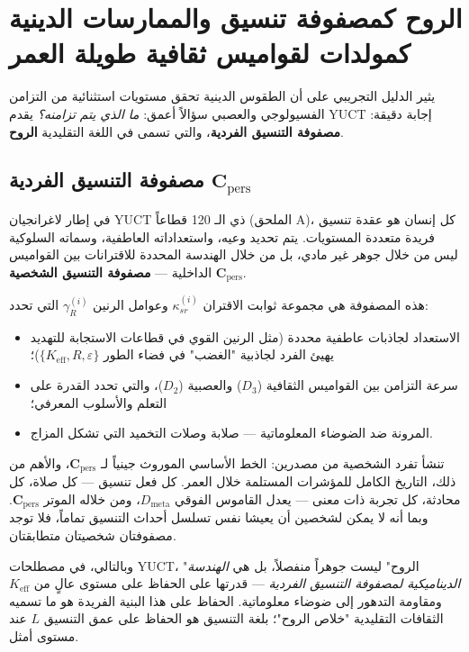 \documentclass[12pt,a4paper]{article}
\begin{document}
	\section{الروح كمصفوفة تنسيق والممارسات الدينية كمولدات لقواميس ثقافية طويلة العمر}
	\label{sec:soul-matrix}
	
	يثير الدليل التجريبي على أن الطقوس الدينية تحقق مستويات استثنائية من التزامن الفسيولوجي والعصبي سؤالاً أعمق: \emph{ما الذي يتم تزامنه؟} يقدم YUCT إجابة دقيقة: \textbf{مصفوفة التنسيق الفردية}، والتي تسمى في اللغة التقليدية \textbf{الروح}.
	
	\subsection{مصفوفة التنسيق الفردية \(\mathbf{C}_{\text{pers}}\)}
	
	في إطار لاغرانجيان YUCT ذي الـ 120 قطاعاً (الملحق A)، كل إنسان هو عقدة تنسيق فريدة متعددة المستويات. يتم تحديد وعيه، واستعداداته العاطفية، وسماته السلوكية ليس من خلال جوهر غير مادي، بل من خلال الهندسة المحددة للاقترانات بين القواميس الداخلية — \textbf{مصفوفة التنسيق الشخصية} \(\mathbf{C}_{\text{pers}}\).
	
	هذه المصفوفة هي مجموعة ثوابت الاقتران \(\kappa_{sr}^{(i)}\) وعوامل الرنين \(\gamma_{R}^{(i)}\) التي تحدد:
	\begin{itemize}
		\item الاستعداد لجاذبات عاطفية محددة (مثل الرنين القوي في قطاعات الاستجابة للتهديد يهيئ الفرد لجاذبية "الغضب" في فضاء الطور \(\{K_{\mathrm{eff}}, R, \varepsilon\}\))؛
		\item سرعة التزامن بين القواميس الثقافية (\(D_3\)) والعصبية (\(D_2\))، والتي تحدد القدرة على التعلم والأسلوب المعرفي؛
		\item المرونة ضد الضوضاء المعلوماتية — صلابة وصلات التخميد التي تشكل المزاج.
	\end{itemize}
	
	تنشأ تفرد الشخصية من مصدرين: الخط الأساسي الموروث جينياً لـ \(\mathbf{C}_{\text{pers}}\)، والأهم من ذلك، التاريخ الكامل للمؤشرات المستلمة خلال العمر. كل فعل تنسيق — كل صلاة، كل محادثة، كل تجربة ذات معنى — يعدل القاموس الفوقي \(D_{\text{meta}}\)، ومن خلاله الموتر \(\mathbf{C}_{\text{pers}}\). وبما أنه لا يمكن لشخصين أن يعيشا نفس تسلسل أحداث التنسيق تماماً، فلا توجد مصفوفتان شخصيتان متطابقتان.
	
	وبالتالي، في مصطلحات YUCT، "الروح" ليست جوهراً منفصلاً، بل هي \emph{الهندسة الديناميكية لمصفوفة التنسيق الفردية} — قدرتها على الحفاظ على مستوى عالٍ من \(K_{\mathrm{eff}}\) ومقاومة التدهور إلى ضوضاء معلوماتية. الحفاظ على هذا البنية الفريدة هو ما تسميه الثقافات التقليدية "خلاص الروح"؛ بلغة التنسيق هو الحفاظ على عمق التنسيق \(L\) عند مستوى أمثل.
	
\end{document}
